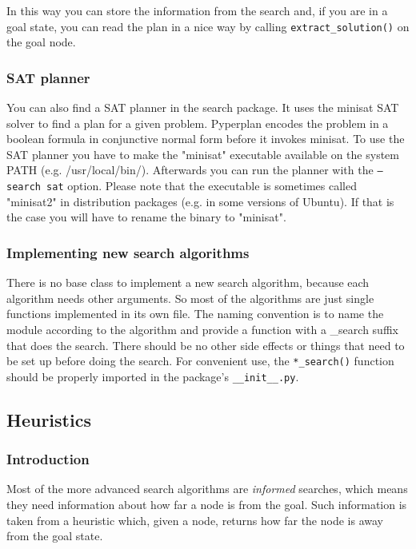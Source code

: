 \documentclass{article}
\begin{document}
In this way you can store the information from the search and, if
you are in a goal state, you can read the plan in a nice way by calling
\texttt{extract\_solution()} on the goal node.

\hypertarget{toc11}{}
\subsubsection{SAT planner}

You can also find a SAT planner in the search package. It uses the minisat
SAT solver to find a plan for a given problem. Pyperplan encodes the problem
in a boolean formula in conjunctive normal form before it invokes minisat. To
use the SAT planner you have to make the "minisat" executable available on the
system PATH (e.g. /usr/local/bin/). Afterwards you can run the planner
with the \texttt{--search sat} option. Please note that the executable is sometimes
called "minisat2" in distribution packages (e.g. in some versions of Ubuntu).
If that is the case you will have to rename the binary to "minisat".

\hypertarget{toc12}{}
\subsubsection{Implementing new search algorithms}

There is no base class to implement a new search algorithm,
because each algorithm needs other arguments. So most of the
algorithms are just single functions implemented in its own file.
The naming convention is to name the module according to the
algorithm and provide a function with a \_search suffix that does
the search. There should be no other side effects or things
that need to be set up before doing the search.
For convenient use, the \texttt{*\_search()} function should be properly imported
in the package's \texttt{\_\_init\_\_.py}.

\hypertarget{toc13}{}
\subsection{Heuristics}

\hypertarget{toc14}{}
\subsubsection{Introduction}

Most of the more advanced search algorithms are \textit{informed} searches, which
means they need information about how far a node is from the goal. Such
information is taken from a heuristic which, given a node, returns how far
the node is away from the goal state.
\end{document}

